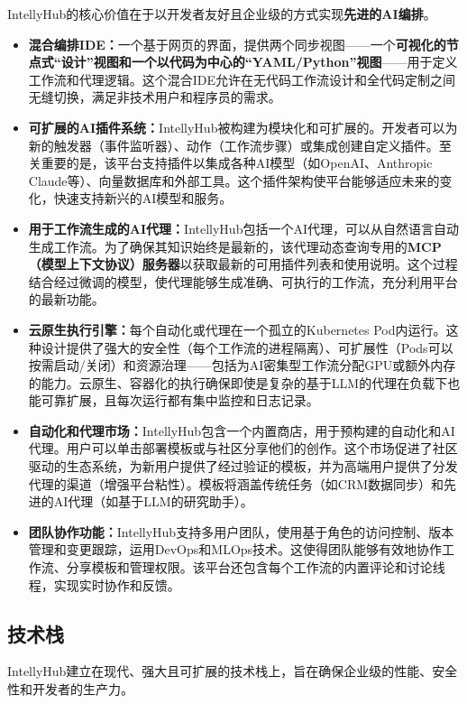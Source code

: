 \documentclass[11pt, a4paper, oneside]{article}
\begin{document}
IntellyHub的核心价值在于以开发者友好且企业级的方式实现\textbf{先进的AI编排}。
\begin{itemize}
    \item \textbf{混合编排IDE：}一个基于网页的界面，提供两个同步视图——一个\textbf{可视化的节点式“设计”视图和一个以代码为中心的“YAML/Python”视图}——用于定义工作流和代理逻辑。这个混合IDE允许在无代码工作流设计和全代码定制之间无缝切换，满足非技术用户和程序员的需求。
    
    \item \textbf{可扩展的AI插件系统：}IntellyHub被构建为模块化和可扩展的。开发者可以为新的触发器（事件监听器）、动作（工作流步骤）或集成创建自定义插件。至关重要的是，该平台支持插件以集成各种AI模型（如OpenAI、Anthropic Claude等）、向量数据库和外部工具。这个插件架构使平台能够适应未来的变化，快速支持新兴的AI模型和服务。
    
    \item \textbf{用于工作流生成的AI代理：}IntellyHub包括一个AI代理，可以从自然语言自动生成工作流。为了确保其知识始终是最新的，该代理动态查询专用的\textbf{MCP（模型上下文协议）服务器}以获取最新的可用插件列表和使用说明。这个过程结合经过微调的模型，使代理能够生成准确、可执行的工作流，充分利用平台的最新功能。
    
    \item \textbf{云原生执行引擎：}每个自动化或代理在一个孤立的Kubernetes Pod内运行。这种设计提供了强大的安全性（每个工作流的进程隔离）、可扩展性（Pods可以按需启动/关闭）和资源治理——包括为AI密集型工作流分配GPU或额外内存的能力。云原生、容器化的执行确保即使是复杂的基于LLM的代理在负载下也能可靠扩展，且每次运行都有集中监控和日志记录。
    
    \item \textbf{自动化和代理市场：}IntellyHub包含一个内置商店，用于预构建的自动化和AI代理。用户可以单击部署模板或与社区分享他们的创作。这个市场促进了社区驱动的生态系统，为新用户提供了经过验证的模板，并为高端用户提供了分发代理的渠道（增强平台粘性）。模板将涵盖传统任务（如CRM数据同步）和先进的AI代理（如基于LLM的研究助手）。
    
    \item \textbf{团队协作功能：}IntellyHub支持多用户团队，使用基于角色的访问控制、版本管理和变更跟踪，运用DevOps和MLOps技术。这使得团队能够有效地协作工作流、分享模板和管理权限。该平台还包含每个工作流的内置评论和讨论线程，实现实时协作和反馈。
\end{itemize}

\pagebreak
\subsection{技术栈}
IntellyHub建立在现代、强大且可扩展的技术栈上，旨在确保企业级的性能、安全性和开发者的生产力。
\end{document}

